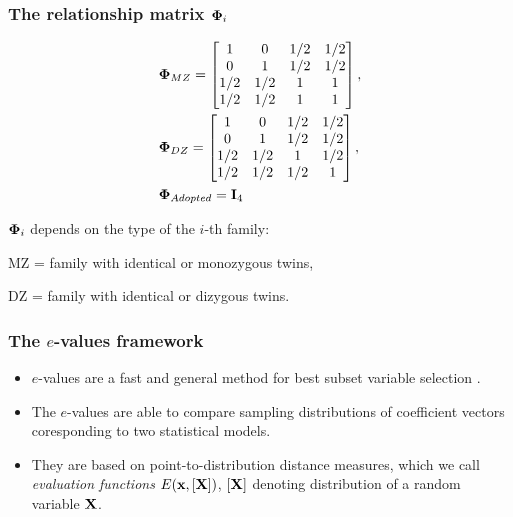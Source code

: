 \documentclass[handout,10pt]{beamer}
\begin{document}
\begin{frame}
\frametitle{The relationship matrix ${\boldsymbol{\Phi}}_i$}
%
\begin{minipage}{.63\textwidth}
%
\begin{align*}
& \bfPhi_{MZ} = \begin{bmatrix}
1 & 0 & 1/2 & 1/2 \\
0 & 1 & 1/2 & 1/2 \\
1/2 & 1/2 & 1 & 1\\
1/2 & 1/2 & 1 & 1
\end{bmatrix},\\
& \bfPhi_{DZ} = \begin{bmatrix}
1 & 0 & 1/2 & 1/2 \\
0 & 1 & 1/2 & 1/2 \\
1/2 & 1/2 & 1 & 1/2\\
1/2 & 1/2 & 1/2 & 1
\end{bmatrix},\vspace{1em}
\\
& \bfPhi_{Adopted} = \bfI_4
\end{align*}
%
\end{minipage}
%
\begin{minipage}{.34\textwidth}
${\boldsymbol{\Phi}}_i$ depends on the type of the $i$-th family:

\vspace{1em}

MZ = family with identical or monozygous twins,

DZ = family with identical or dizygous twins.

\end{minipage}

\end{frame}


\begin{frame}
\frametitle{The $e$-values framework}

\begin{itemize}
\item $e$-values are a fast and general method for best subset variable selection \citep{MajumdarChatterjee17}.

\item The $e$-values are able to compare sampling distributions of coefficient vectors coresponding to two statistical models.

\item They are based on point-to-distribution distance measures, which we call {\it evaluation functions} $E({\bf{x}}, [{\mathbf{X}}])$, $[{\mathbf{X}}]$ denoting distribution of a random variable ${\mathbf{X}}$.
\end{itemize}
\end{frame}
\end{document}
